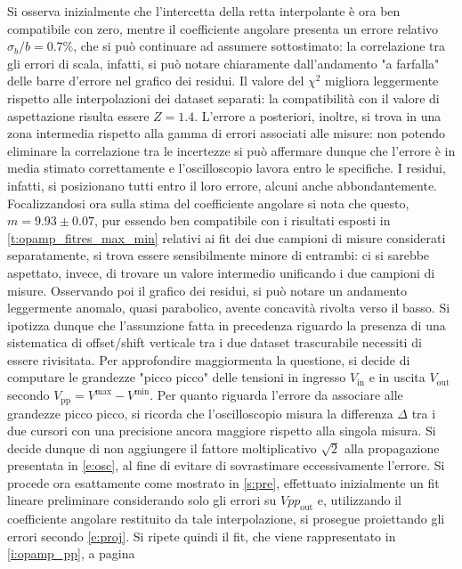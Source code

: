 \documentclass[a4paper,11pt]{article} %
\begin{document}
\noindent Si osserva inizialmente che l'intercetta della retta interpolante è ora ben compatibile con zero, mentre il
coefficiente angolare presenta un errore relativo $\sigma_{b}/b=0.7\%$, che si può continuare ad assumere sottostimato:
la correlazione tra gli errori di scala, infatti, si può notare chiaramente dall'andamento "a farfalla" delle barre
d'errore nel grafico dei residui. Il valore del $\chi^2$ migliora leggermente rispetto alle interpolazioni dei dataset
separati: la compatibilità con il valore di aspettazione risulta essere $Z=1.4$. L'errore a posteriori, inoltre, si
trova in una zona intermedia rispetto alla gamma di errori associati alle misure: non potendo eliminare la correlazione
tra le incertezze si può affermare dunque che l'errore è in media stimato correttamente e l'oscilloscopio lavora entro
le specifiche. I residui, infatti, si posizionano tutti entro il loro errore, alcuni anche abbondantemente.
Focalizzandosi ora sulla stima del coefficiente angolare si nota che questo, $m=9.93\pm 0.07$, pur essendo ben
compatibile con i risultati esposti in  \autoref{t:opamp_fitres_max_min} relativi ai fit dei due campioni di misure
considerati separatamente, si trova essere sensibilmente minore di entrambi: ci si sarebbe aspettato, invece, di trovare
un valore intermedio unificando i due campioni di misure. Osservando poi il grafico dei residui, si può notare un
andamento leggermente anomalo, quasi parabolico, avente concavità rivolta verso il basso. Si ipotizza dunque che
l'assunzione fatta in precedenza riguardo la presenza di una sistematica di offset/shift verticale tra i due dataset
trascurabile necessiti di essere rivisitata. Per approfondire maggiormenta la questione, si decide di computare le
grandezze "picco picco" delle tensioni in ingresso $V_{\text{in}}$ e in uscita $V_{\text{out}}$ secondo
$V_{\text{pp}}=V^{\text{max}}-V^{\text{min}}$. Per quanto riguarda l'errore da associare alle grandezze picco picco, si
ricorda che l'oscilloscopio misura la differenza $\Delta$ tra i due cursori con una precisione ancora maggiore rispetto
alla singola misura. Si decide dunque di non aggiungere il fattore moltiplicativo $\sqrt{2}$ alla propagazione
presentata in  \autoref{e:osc}, al fine di evitare di sovrastimare eccessivamente l'errore. Si procede ora esattamente
come mostrato in  \autoref{s:pre}, effettuato inizialmente un fit lineare preliminare considerando solo gli errori su
$Vpp_{\text{out}}$ e, utilizzando il coefficiente angolare restituito da tale interpolazione, si prosegue proiettando
gli errori secondo  \autoref{e:proj}. Si ripete quindi il fit, che viene rappresentato in \autoref{i:opamp_pp}, a pagina
\end{document}

